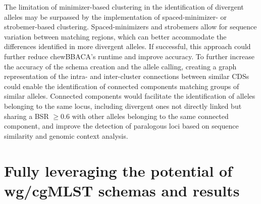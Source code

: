The limitation of minimizer-based clustering in the identification of divergent alleles may be surpassed by the implementation of spaced-minimizer- or strobemer-based clustering. Spaced-minimizers and strobemers allow for sequence variation between matching regions, which can better accommodate the differences identified in more divergent alleles. If successful, this approach could further reduce chewBBACA's runtime and improve accuracy. To further increase the accuracy of the schema creation and the allele calling, creating a graph representation of the intra- and inter-cluster connections between similar CDSs could enable the identification of connected components matching groups of similar alleles. Connected components would facilitate the identification of alleles belonging to the same locus, including divergent ones not directly linked but sharing a BSR $\geq0.6$ with other alleles belonging to the same connected component, and improve the detection of paralogous loci based on sequence similarity and genomic context analysis.

\section{Fully leveraging the potential of wg/cgMLST schemas and results}

